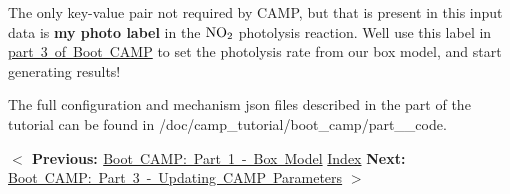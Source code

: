 The only key-\/value pair not required by CAMP, but that is present in this input data is {\bfseries{my photo label}} in the $\ce{NO2}$ photolysis reaction. We\textquotesingle{}ll use this label in \mbox{\hyperlink{camp_tutorial_part_3}{part 3 of Boot CAMP}} to set the photolysis rate from our box model, and start generating results!

The full configuration and mechanism {\ttfamily json} files described in the part of the tutorial can be found in {\ttfamily /doc/camp\+\_\+tutorial/boot\+\_\+camp/part\+\_\+\_\+code}.

 {\bfseries{ $<$ Previous\+: }} \mbox{\hyperlink{camp_tutorial_part_1}{Boot CAMP\+: Part 1 -\/ Box Model}}  \mbox{\hyperlink{camp_tutorial}{Index}}  {\bfseries{ Next\+: }} \mbox{\hyperlink{camp_tutorial_part_3}{Boot CAMP\+: Part 3 -\/ Updating CAMP Parameters}} {\bfseries{ $>$ }} 